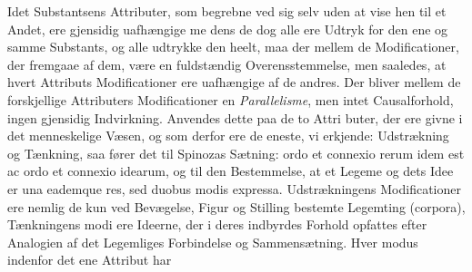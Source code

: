 \documentclass[12pt,a4paper]{book}
\begin{document}
Idet Substantsens Attributer, som begrebne ved sig selv
uden at vise hen til et Andet, ere gjensidig uafhængige me\-%
dens de dog alle ere Udtryk for den ene og samme Substants,
og alle udtrykke den heelt, maa der mellem de Modificationer,
der fremgaae af dem, være en fuldstændig Overensstemmelse,
men saaledes, at hvert Attributs Modificationer ere uafhængige
af de andres. Der bliver mellem de forskjellige Attributers
Modificationer en \emph{Parallelisme}, men intet Causalforhold,
ingen gjensidig Indvirkning. Anvendes dette paa de to Attri\-%
buter, der ere givne i det menneskelige Væsen, og som derfor
ere de eneste, vi erkjende: Udstrækning og Tænkning, saa
fører det til Spinozas Sætning: ordo et connexio rerum idem
est ac ordo et connexio idearum, og til den Bestemmelse, at et
Legeme og dets Idee er una eademque res, sed duobus modis
expressa. Udstrækningens Modificationer ere nemlig de kun
ved Bevægelse, Figur og Stilling bestemte Legemting (corpora),
Tænkningens modi ere Ideerne, der i deres indbyrdes Forhold
opfattes efter Analogien af det Legemliges Forbindelse og
Sammensætning. Hver modus indenfor det ene Attribut har
\end{document}
